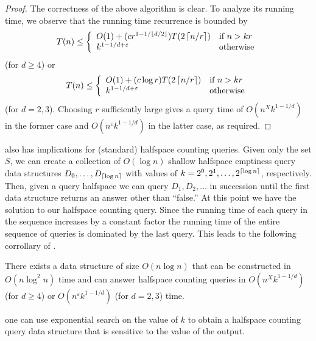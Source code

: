\documentclass[lotsofwhite]{patmorin}
\newcommand{\eps}{\varepsilon}
\begin{document}
\begin{proof}
The correctness of the above algorithm is clear. To analyze its
running time, we observe that the running time recurrence is bounded
by
\[
   T(n) \le \left\{ \begin{array}{ll}
     O(1) + (cr^{1-1/\floor{d/2}})T(2\ceil{n/r}) & \mbox{if $n > kr$} \\
     k^{1-1/d+\eps} & \mbox{otherwise} 
   \end{array}\right.
\]
(for $d\ge 4$) or
\[
   T(n) \le \left\{ \begin{array}{ll}
     O(1) + (c\log r)T(2\ceil{n/r}) & \mbox{if $n > kr$} \\
     k^{1-1/d+\eps} & \mbox{otherwise} 
   \end{array}\right.
\]
(for $d=2,3$).  Choosing $r$ sufficiently large gives a query time of
$O(n^Xk^{1-1/d})$ in the former case and $O(n^\eps k^{1-1/d})$ in the
latter case, as required.
\end{proof}

 also has implications for (standard) halfspace counting
queries. Given only the set $S$, we can create a collection of $O(\log
n)$ shallow halfspace emptiness query data structures
$D_0,\ldots,D_{\left\lceil \log n \right\rceil}$ with values of
$k=2^0,2^1,\ldots,2^{\left\lceil \log n \right\rceil}$, respectively.  Then, given a
query halfspace we can query $D_1,D_2,\ldots$ in succession until the
first data structure returns an answer other than ``false.''  At this
point we have the solution to our halfspace counting query.  Since the
running time of each query in the sequence increases by a constant
factor the running time of the entire sequence of queries is dominated
by the last query. This leads to the following corrollary of
.

\begin{cor}
There exists a data structure of size $O(n\log n)$ that can be
constructed in $O(n\log^2 n)$ time and can answer
halfspace counting queries in $O(n^Xk^{1-1/d})$ (for $d\ge 4$) or
$O(n^\eps k^{1-1/d})$ (for $d=2,3$) time.
\end{cor}


one can use exponential search on the
value of $k$ to obtain a halfspace counting query data structure that
is sensitive to the value of the output.
\end{document}
